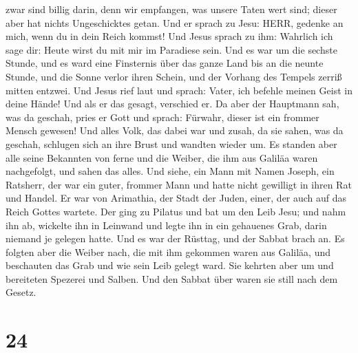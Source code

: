 zwar sind billig darin, denn wir empfangen, was unsere Taten wert sind;
dieser aber hat nichts Ungeschicktes getan.  Und er sprach
zu Jesu: HERR, gedenke an mich, wenn du in dein Reich kommst!
 Und Jesus sprach zu ihm: Wahrlich ich sage dir: Heute
wirst du mit mir im Paradiese sein.  Und es war um die
sechste Stunde, und es ward eine Finsternis über das ganze Land bis an
die neunte Stunde,  und die Sonne verlor ihren Schein, und
der Vorhang des Tempels zerriß mitten entzwei.  Und Jesus
rief laut und sprach: Vater, ich befehle meinen Geist in deine Hände!
Und als er das gesagt, verschied er.  Da aber der Hauptmann
sah, was da geschah, pries er Gott und sprach: Fürwahr, dieser ist ein
frommer Mensch gewesen!  Und alles Volk, das dabei war und
zusah, da sie sahen, was da geschah, schlugen sich an ihre Brust und
wandten wieder um.  Es standen aber alle seine Bekannten
von ferne und die Weiber, die ihm aus Galiläa waren nachgefolgt, und
sahen das alles.  Und siehe, ein Mann mit Namen Joseph, ein
Ratsherr, der war ein guter, frommer Mann  und hatte nicht
gewilligt in ihren Rat und Handel. Er war von Arimathia, der Stadt der
Juden, einer, der auch auf das Reich Gottes wartete.  Der
ging zu Pilatus und bat um den Leib Jesu;  und nahm ihn ab,
wickelte ihn in Leinwand und legte ihn in ein gehauenes Grab, darin
niemand je gelegen hatte.  Und es war der Rüsttag, und der
Sabbat brach an.  Es folgten aber die Weiber nach, die mit
ihm gekommen waren aus Galiläa, und beschauten das Grab und wie sein
Leib gelegt ward.  Sie kehrten aber um und bereiteten
Spezerei und Salben. Und den Sabbat über waren sie still nach dem
Gesetz.

\hypertarget{section-23}{%
\section{24}\label{section-23}}

